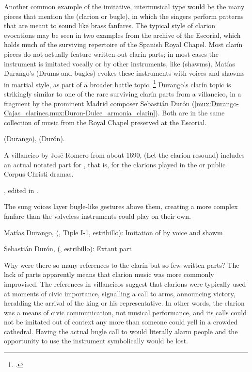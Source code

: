 Another common example of the imitative, intermusical type would be the many
pieces that mention the  (clarion or bugle), in which the
singers perform patterns that are meant to sound like brass fanfares.
The typical style of clarion evocations may be seen in two examples from the
archive of the Escorial, which holds much of the surviving repertoire of the
Spanish Royal Chapel.
Most clarín pieces do not actually feature written-out clarín parts; in most
cases the instrument is imitated vocally or by other instruments, like
 (shawms).
Matías Durango's  (Drums and bugles) evokes these
instruments with voices and shawms in martial style, as part of a broader
battle topic.%
    \footnote{.}
Durango's clarín topic is strikingly similar to one of the rare surviving
clarín parts from a villancico, in a fragment by the prominent Madrid composer
Sebastián Durón
(\cref{mux:Durango-Cajas_clarines,mux:Duron-Dulce_armonia_clarin}).
Both are in the same collection of music from the Royal Chapel preserved at the
Escorial.%
\begin{Footnote}
     (Durango),  (Durón).
\end{Footnote}
A villancico by José Romero from about 1690,  (Let the
clarion resound) includes an actual notated part for , that is, for the clarions played in the 
or public Corpus Christi dramas.%
\begin{Footnote} 
    , edited in \autocite[655--661]{CaberoPueyo:PhD}.
\end{Footnote}
The sung voices layer bugle-like gestures above them, creating a more complex
fanfare than the valveless instruments could play on their own.

{Matías Durango,  (, Tiple I-1,
estribillo): Imitation of  by voice and shawm}

{Sebastián Durón,  (, estribillo):
Extant  part}

Why were there so many references to the clarín but so few written parts?
The lack of parts apparently means that clarion music was more commonly
improvised.  
The references in villancicos suggest that clarions were typically used at
moments of civic importance, signalling a call to arms, announcing victory,
heralding the arrival of the king or his representative.
In other words, the clarion was a means of civic communication, not musical
performance, and its calls could not be imitated out of context any more than
someone could yell  in a crowded cathedral.
Having the actual bugle call to would literally alarm people and the
opportunity to use the instrument symbolically would be lost.

